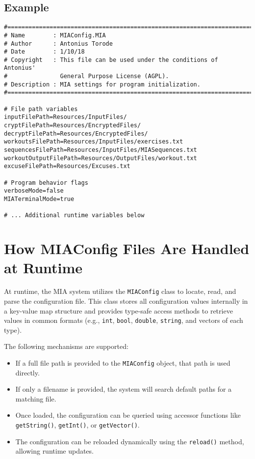 \subsection*{Example}

\begin{lstlisting}[style=pythonstyle]
#============================================================================
# Name        : MIAConfig.MIA
# Author      : Antonius Torode
# Date        : 1/10/18
# Copyright   : This file can be used under the conditions of Antonius' 
#               General Purpose License (AGPL).
# Description : MIA settings for program initialization.
#============================================================================

# File path variables
inputFilePath=Resources/InputFiles/
cryptFilePath=Resources/EncryptedFiles/
decryptFilePath=Resources/EncryptedFiles/
workoutsFilePath=Resources/InputFiles/exercises.txt
sequencesFilePath=Resources/InputFiles/MIASequences.txt
workoutOutputFilePath=Resources/OutputFiles/workout.txt
excuseFilePath=Resources/Excuses.txt

# Program behavior flags
verboseMode=false
MIATerminalMode=true

# ... Additional runtime variables below
\end{lstlisting}

\section{How MIAConfig Files Are Handled at Runtime}

At runtime, the MIA system utilizes the \texttt{MIAConfig} class to locate, read, and parse the configuration file. This class stores all configuration values internally in a key-value map structure and provides type-safe access methods to retrieve values in common formats (e.g., \texttt{int}, \texttt{bool}, \texttt{double}, \texttt{string}, and vectors of each type).

The following mechanisms are supported:

\begin{itemize}
	\item If a full file path is provided to the \texttt{MIAConfig} object, that path is used directly.
	\item If only a filename is provided, the system will search default paths for a matching file.
	\item Once loaded, the configuration can be queried using accessor functions like \texttt{getString()}, \texttt{getInt()}, or \texttt{getVector()}.
	\item The configuration can be reloaded dynamically using the \texttt{reload()} method, allowing runtime updates.
\end{itemize}

